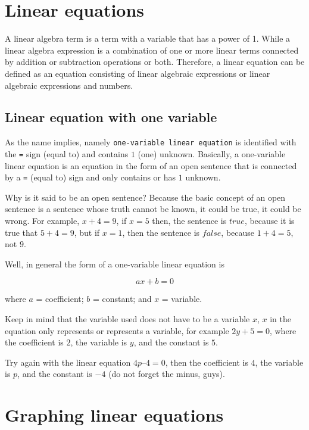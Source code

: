 \documentclass[
]{book}
\begin{document}
\hypertarget{linear-equations}{%
\section{Linear equations}\label{linear-equations}}

A linear algebra term is a term with a variable that has a power of 1. While a linear algebra expression is a combination of one or more linear terms connected by addition or subtraction operations or both. Therefore, a linear equation can be defined as an equation consisting of linear algebraic expressions or linear algebraic expressions and numbers.

\hypertarget{linear-equation-with-one-variable}{%
\subsection{Linear equation with one variable}\label{linear-equation-with-one-variable}}

As the name implies, namely \texttt{one-variable\ linear\ equation} is identified with the \texttt{=} sign (equal to) and contains \(1\) (one) unknown. Basically, a one-variable linear equation is an equation in the form of an open sentence that is connected by a \texttt{=} (equal to) sign and only contains or has \(1\) unknown.

Why is it said to be an open sentence? Because the basic concept of an open sentence is a sentence whose truth cannot be known, it could be true, it could be wrong. For example, \(x+4=9\), if \(x=5\) then, the sentence is \(true\), because it is true that \(5+4=9\), but if \(x=1\), then the sentence is \(false\), because \(1+4=5\), not \(9\).

Well, in general the form of a one-variable linear equation is

\[ax+b=0\]

where \(a\) = coefficient; \(b\) = constant; and \(x\) = variable.

Keep in mind that the variable used does not have to be a variable \(x\), \(x\) in the equation only represents or represents a variable, for example \(2y+5=0\), where the coefficient is \(2\), the variable is \(y\), and the constant is \(5\).

Try again with the linear equation \(4p–4=0\), then the coefficient is \(4\), the variable is \(p\), and the constant is \(-4\) (do not forget the minus, guys).

\hypertarget{graphing-linear-equations}{%
\section{Graphing linear equations}\label{graphing-linear-equations}}
\end{document}
